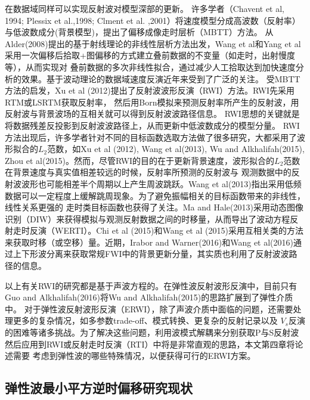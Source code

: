 在数据域同样可以实现反射波对模型深部的更新。
许多学者（Chavent et al, 1994\cite{ChaventEtAl1994}; Plessix et al.,1998\cite{PlessixEtAl1998}; Clment et al.
,2001\cite{ClementEtAl2001}）将速度模型分成高波数（反射率）与低波数成分(背景模型)，提出了偏移成像走时层析（MBTT）方法。
从Alder(2008)\cite{Adler2008}提出的基于射线理论的非线性层析方法出发，Wang
et al\cite{WangEtAl2014}和Yang et al\cite{YangEtAl2016}采用一次偏移后拾取+图偏移的方式建立叠前数据的不变量（如走时，出射慢度等），从而实现对
叠前数据的多次非线性拟合，通过减少人工拾取达到加快速度分析的效果。基于波动理论的数据域速度反演近年来受到了广泛的关注。
受MBTT方法的启发，Xu et al (2012)\cite{xu:2012}提出了反射波波形反演（RWI）方法。RWI先采用RTM或LSRTM获取反射率，
然后用Born模拟来预测反射率所产生的反射波，用反射波与背景波场的互相关就可以得到反射波波路径信息。
RWI思想的关键就是将数据残差反投影到反射波波路径上，从而更新中低波数成分的模型分量。
RWI方法出现后，许多学者针对不同的目标函数选取方法做了很多研究，大都采用了波形拟合的$L_2$范数，如Xu
et al (2012)\cite{xu:2012}, Wang et al(2013)\cite{Wang2013}, Wu and
Alkhalifah(2015)\cite{Wu2015b},
Zhou et al(2015)\cite{zhou:2015}。然而，尽管RWI的目的在于更新背景速度，波形拟合的$L_2$范数在背景速度与真实值相差较远的时候，反射率所预测的反射波与
观测数据中的反射波波形也可能相差半个周期以上产生周波跳跃。Wang et
al(2013)\cite{Wang2013}指出采用低频数据可以一定程度上缓解跳周现象。为了避免振幅相关的目标函数带来的非线性，线性关系更强的
走时类目标函数也获得了关注。Ma and
Hale(2013)\cite{ma2013}采用动态图像识别（DIW）来获得模拟与观测反射数据之间的时移量，从而导出了波动方程反射走时反演（WERTI）。Chi
et al (2015)\cite{chi2015}和Wang et al
(2015)\cite{Wang2015}采用互相关类的方法来获取时移（或空移）量。近期，Irabor and
Warner(2016)\cite{Irabor2016}和Wang et al(2016)\cite{WangFangEtAl2016}通过上下形波分离来获取常规FWI中的背景更新分量，其实质也利用了反射波波路径的信息。

以上有关RWI的研究都是基于声波方程的。在弹性波反射波形反演中，目前只有Guo and
Alkhalifah(2016)\cite{Guo2016}将Wu and
Alkhalifah(2015)\cite{Wu2015b}的思路扩展到了弹性介质中。
对于弹性波反射波形反演（ERWI），除了声波介质中面临的问题，还需要处理更多的复杂情况，如多参数trade-off、模式转换、更复杂的反射记录以及
$V_s$反演的困难等诸多挑战。为了解决这些问题，利用波模式解耦来分别获取P与S反射波然后应用到RWI或反射走时反演（RTI）中将是非常直观的思路，本文第四章将论述需要
考虑到弹性波的哪些特殊情况，以便获得可行的ERWI方案。

\subsection{弹性波最小平方逆时偏移研究现状}

